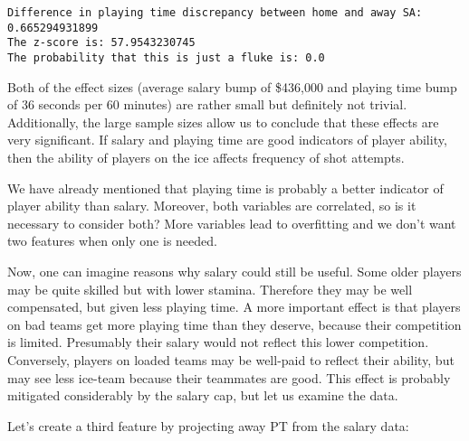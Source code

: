\documentclass[11pt]{article}
\begin{document}
    \begin{Verbatim}[commandchars=\\\{\}]
Difference in playing time discrepancy between home and away SA: 0.665294931899
The z-score is: 57.9543230745
The probability that this is just a fluke is: 0.0

    \end{Verbatim}

    Both of the effect sizes (average salary bump of \$436,000 and playing
time bump of 36 seconds per 60 minutes) are rather small but definitely
not trivial. Additionally, the large sample sizes allow us to conclude
that these effects are very significant. If salary and playing time are
good indicators of player ability, then the ability of players on the
ice affects frequency of shot attempts.

    We have already mentioned that playing time is probably a better
indicator of player ability than salary. Moreover, both variables are
correlated, so is it necessary to consider both? More variables lead to
overfitting and we don't want two features when only one is needed.

Now, one can imagine reasons why salary could still be useful. Some
older players may be quite skilled but with lower stamina. Therefore
they may be well compensated, but given less playing time. A more
important effect is that players on bad teams get more playing time than
they deserve, because their competition is limited. Presumably their
salary would not reflect this lower competition. Conversely, players on
loaded teams may be well-paid to reflect their ability, but may see less
ice-team because their teammates are good. This effect is probably
mitigated considerably by the salary cap, but let us examine the data.

Let's create a third feature by projecting away PT from the salary data:
\end{document}
